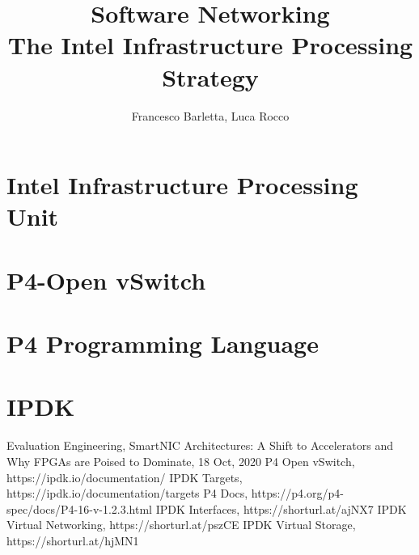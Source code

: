 \documentclass[11pt]{article}
\title{
    Software Networking \\
    \large The Intel Infrastructure Processing Strategy}
\begin{document}
\author{Francesco Barletta, Luca Rocco}

\maketitle

\tableofcontents

\clearpage

\section{Intel\raisebox {1mm}{\textregistered} Infrastructure Processing Unit}


\section{P4-Open vSwitch}


\section{P4 Programming Language}


\section{IPDK}


\clearpage

\printnoidxglossary[type=acronym]
\printacronyms

\clearpage

\begin{thebibliography}{1}
    Evaluation Engineering, SmartNIC Architectures: A Shift to Accelerators and Why FPGAs are Poised to Dominate, 18 Oct, 2020
    P4 Open vSwitch, https://ipdk.io/documentation/
    IPDK Targets, https://ipdk.io/documentation/targets
    P4 Docs, https://p4.org/p4-spec/docs/P4-16-v-1.2.3.html
    IPDK Interfaces, https://shorturl.at/ajNX7
    IPDK Virtual Networking, https://shorturl.at/pszCE
    IPDK Virtual Storage, https://shorturl.at/hjMN1
\end{thebibliography}
\end{document}
